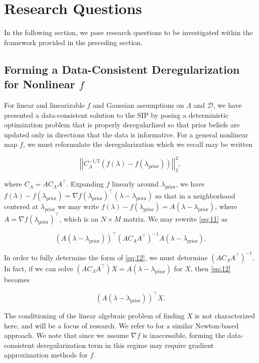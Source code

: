 \documentclass{amsart}
\begin{document}
\section{Research Questions}

In the following section, we pose research questions to be investigated within the framework provided in the preceding section. 

\subsection{Forming a Data-Consistent Deregularization for Nonlinear $f$} For linear and linearizable $f$ and Gaussian assumptions on $\Lambda$ and $\mathcal{D}$, we have presented a data-consistent solution to the SIP by posing a deterministic optimization problem that is properly deregularlized so that prior beliefs are updated only in directions that the data is informative. For a general nonlinear map $f$, we must reformulate the deregularization which we recall may be written

\begin{equation} \label{eq:11}
\left|\left|C_A^{-1/2}(f(\lambda)-f(\lambda_{\text{prior}}))\right|\right|_2^2,
\end{equation} 

\noindent where $C_A=AC_\Lambda A^\top$. Expanding $f$ linearly around $\lambda_\text{prior}$, we have $f(\lambda)-f(\lambda_\text{prior})=\nabla f (\lambda_\text{prior})^\top (\lambda-\lambda_\text{prior})$ so that in a neighborhood centered at $\lambda_\text{prior}$ we may write $f(\lambda)-f(\lambda_\text{prior})=A (\lambda-\lambda_\text{prior})$, where $A=\nabla f (\lambda_\text{prior})^\top$, which is an $N \times M$ matrix. We may rewrite \eqref{eq:11} as


\begin{equation} \label{eq:12}
(A(\lambda-\lambda_\text{prior}))^\top (AC_\Lambda A^\top)^{-1}A(\lambda-\lambda_\text{prior}).
\end{equation}

In order to fully determine the form of \eqref{eq:12}, we must determine $(AC_\Lambda A^\top)^{-1}$. In fact, if we can solve $(AC_\Lambda A^\top)X=A(\lambda-\lambda_\text{prior})$ for $X$, then \eqref{eq:12} becomes

\begin{equation} \label{eq:13}
(A(\lambda-\lambda_\text{prior}))^\top X.
\end{equation}

The conditioning of the linear algebraic problem of finding  $X$ is not characterized here, and will be a focus of research. We refer to \cite{Tarantola} for a similar Newton-based approach. We note that since we assume $\nabla f$ is inaccessible, forming the data-consistent deregularization term in this regime may require gradient approximation methods for $f$.
\end{document}
